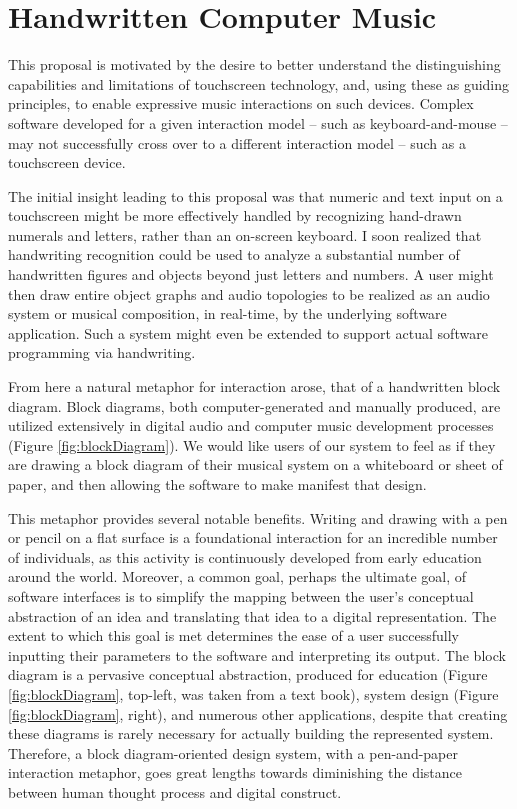 \documentclass[10pt,letterpaper]{article}
\begin{document}
\section{Handwritten Computer Music}
\label{sec:HandwrittenComputerMusic}

This proposal is motivated by the desire to better understand the distinguishing capabilities and limitations of touchscreen technology, and, using these as guiding principles, to enable expressive music interactions on such devices. 
Complex software developed for a given interaction model -- such as keyboard-and-mouse -- may not successfully cross over to a different interaction model -- such as a touchscreen device. 

The initial insight leading to this proposal was that numeric and text input on a touchscreen might be more effectively handled by recognizing hand-drawn numerals and letters, rather than an on-screen keyboard. 
I soon realized that handwriting recognition could be used to analyze a substantial number of handwritten figures and objects beyond just letters and numbers. 
A user might then draw entire object graphs and audio topologies to be realized as an audio system or musical composition, in real-time, by the underlying software application. 
Such a system might even be extended to support actual software programming via handwriting. 

From here a natural metaphor for interaction arose, that of a handwritten block diagram.
Block diagrams, both computer-generated and manually produced, are utilized extensively in digital audio and computer music development processes (Figure \ref{fig:blockDiagram}). 
We would like users of our system to feel as if they are drawing a block diagram of their musical system on a whiteboard or sheet of paper, and then allowing the software to make manifest that design. 

This metaphor provides several notable benefits. 
Writing and drawing with a pen or pencil on a flat surface is a foundational interaction for an incredible number of individuals, as this activity is continuously developed from early education around the world. 
Moreover, a common goal, perhaps the ultimate goal, of software interfaces is to simplify the mapping between the user's conceptual abstraction of an idea and translating that idea to a digital representation. 
The extent to which this goal is met determines the ease of a user successfully inputting their parameters to the software and interpreting its output. 
The block diagram is a pervasive conceptual abstraction, produced for education (Figure \ref{fig:blockDiagram}, top-left, was taken from a text book), system design (Figure \ref{fig:blockDiagram}, right), and numerous other applications, despite that creating these diagrams is rarely necessary for actually building the represented system. 
Therefore, a block diagram-oriented design system, with a pen-and-paper interaction metaphor, goes great lengths towards diminishing the distance between human thought process and digital construct. 
\end{document}

